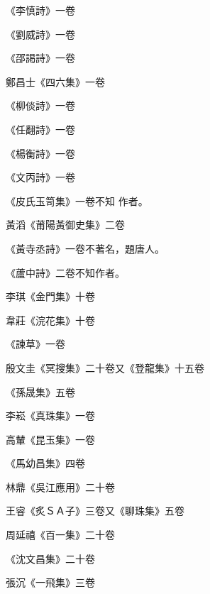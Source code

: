 \begin{pinyinscope}
 《李慎詩》一卷



 《劉威詩》一卷



 《邵謁詩》一卷



 鄭昌士《四六集》一卷



 《柳倓詩》一卷



 《任翻詩》一卷



 《楊衡詩》一卷



 《文丙詩》一卷



 《皮氏玉笥集》一卷不知
 作者。



 黃滔《莆陽黃御史集》二卷



 《黃寺丞詩》一卷不著名，題唐人。



 《蘆中詩》二卷不知作者。



 李琪《金門集》十卷



 韋莊《浣花集》十卷



 《諫草》一卷



 殷文圭《冥搜集》二十卷又《登龍集》十五卷



 《孫晟集》五卷



 李崧《真珠集》一卷



 高輦《昆玉集》一卷



 《馬幼昌集》四卷



 林鼎《吳江應用》二十卷



 王睿《炙ＳＡ子》三卷又《聊珠集》五卷



 周延禧《百一集》二十卷



 《沈文昌集》二十卷



 張沉《一飛集》三卷




\end{pinyinscope}
